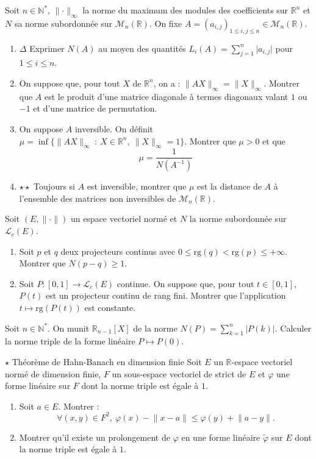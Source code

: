 \documentclass[french,a4paper]{article}
\newcommand{\N}{\mathbb{N}}
\newcommand{\R}{\mathbb{R}}
\newcommand{\st}{^*}
\newcommand{\inv}{^{-1}}
\theoremstyle{plain}
\theoremstyle{definition}
\theoremstyle{remark}
\begin{document}
\begin{ex}{}
	Soit $n\in\N\st$, $\lVert\cdot\rVert_\infty$ la norme du maximum des modules des coefficients sur $\R^n$ et $N$ sa norme subordonnée sur $\mathcal{M}_n(\R)$. On fixe $A=(a_{i,j})_{1\leqslant i,j\leqslant n}\in\mathcal{M}_n(\R)$.
	\begin{enumerate}
		\item $\Delta$ Exprimer $N(A)$ au moyen des quantités $L_i(A)=\displaystyle\sum_{j=1}^{n}\lvert a_{i,j}\rvert$ pour $1\leqslant i\leqslant n$.
		\item On suppose que, pour tout $X$ de $\R^n$, on a : $\lVert AX\rVert_\infty=\lVert X\rVert_\infty$. Montrer que $A$ est le produit d'une matrice diagonale à termes diagonaux valant $1$ ou $-1$ et d'une matrice de permutation.
		\item On suppose $A$ inversible. On définit $\mu=\inf\{\lVert AX\rVert_\infty\ : \ X\in\R^n,\ \lVert X\rVert_\infty=1\}$. Montrer que $\mu>0$ et que $$\mu=\frac{1}{N(A\inv)}$$
		\item $\star\star$ Toujours si $A$ est inversible, montrer que $\mu$ est la distance de $A$ à l'ensemble des matrices non inversibles de $\mathcal{M}_n(\R)$.
	\end{enumerate}
\end{ex}

\begin{ex}{}
	Soit $(E,\lVert\cdot\rVert)$ un espace vectoriel normé et $N$ la norme subordonnée sur $\mathcal{L}_c(E)$.
	\begin{enumerate}
		\item Soit $p$ et $q$ deux projecteurs continus avec $0\leqslant\text{rg}(q)<\text{rg}(p)\leqslant+\infty$. Montrer que $N(p-q)\geqslant 1$.
		\item Soit $P:[0,1]\to\mathcal{L}_c(E)$ continue. On suppose que, pour tout $t\in[0,1]$, $P(t)$ est un projecteur continu de rang fini. Montrer que l'application $t\mapsto\text{rg}(P(t))$ est constante.
	\end{enumerate}
\end{ex}

\begin{ex}{}
	Soit $n\in\N\st$. On munit $\R_{n-1}[X]$ de la norme $N(P)=\displaystyle\sum_{k=1}^{n}\lvert P(k)\rvert$. Calculer la norme triple de la forme linéaire $P\mapsto P(0)$.
\end{ex}

\begin{ex}{$\star$ Théorème de Hahn-Banach en dimension finie}
	Soit $E$ un $\R$-espace vectoriel normé de dimension finie, $F$ un sous-espace vectoriel de strict de $E$ et $\varphi$ une forme linéaire sur $F$ dont la norme triple est égale à $1$.
	\begin{enumerate}
		\item Soit $a\in E$. Montrer : $$\forall (x,y)\in F^2,\ \varphi(x)-\lVert x-a\rVert\leqslant\varphi(y)+\lVert a-y\rVert.$$
		\item Montrer qu'il existe un prolongement de $\varphi$ en une forme linéaire $\tilde{\varphi}$ sur $E$ dont la norme triple est égale à $1$.
	\end{enumerate}
\end{ex}
\end{document}
